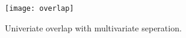 \documentclass{pnastwo}
\begin{document}
\begin{article}





















%


\end{article}


\begin{figure}
\centering
\texttt{[image: overlap]}
\caption{Univeriate overlap with multivariate seperation.}
\label{fig:overlap}
\end{figure}
\end{document}
